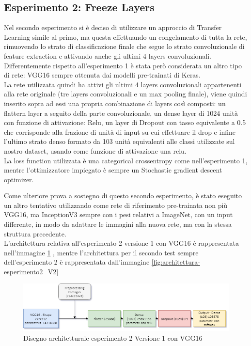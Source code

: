 \subsection{Esperimento 2: Freeze Layers}

Nel secondo esperimento si è deciso di utilizzare un approccio di Transfer Learning simile al primo, ma questa effettuando un congelamento di tutta la rete, rimuovendo lo strato di classificazione finale che segue lo strato convoluzionale di feature extraction e attivando anche gli ultimi 4 layers convoluzionali.
Differentemente rispetto all'esperimento 1 è stata però considerata un altro tipo di rete: VGG16 sempre ottenuta dai modelli pre-trainati di Keras. \\
La rete utilizzata quindi ha attivi gli ultimi 4 layers convoluzionali appartenenti alla rete originale (tre layers convoluzionali e un max pooling finale), viene quindi inserito sopra ad essi una propria combinazione di layers così composti: un flattern layer a seguito della parte convoluzionale, un dense layer di 1024 unità con funzione di attivazione: Relu, un layer di Dropout con tasso equivalente a 0.5 che corrisponde alla frazione di unità di input su cui effettuare il drop e infine l'ultimo strato denso formato da 103 unità equivalenti alle classi utilizzate sul nostro dataset, usando come funzione di attivazione una relu.\\
La loss function utilizzata è una categorical crossentropy come nell'esperimento 1, mentre l'ottimizzatore impiegato è sempre un Stochastic gradient descent optimizer. \bigskip

Come ulteriore prova a sostegno di questo secondo esperimento, è stato eseguito un altro tentativo utilizzando come rete di riferimento pre-trainata non più VGG16, ma InceptionV3 sempre con i pesi relativi a ImageNet, con un input differente, in modo da adattare le immagini alla nuova rete, ma con la stessa struttura precedente. \\
L'architettura relativa all'esperimento 2 versione 1 con VGG16 è rappresentata nell'immagine \ref{fig:architettura-esperimento2_V1} , mentre l'architettura per il secondo test sempre dell'esperimento 2 è rappresentata dall'immagine \ref{fig:architettura-esperimento2_V2}

\begin{figure}
    \centering
    \includegraphics[width=1\textwidth]{./resources/AdvanceMachineLearningSchema-Esperimento2_V1.png}
    \caption{Disegno architetturale esperimento 2 Versione 1 con VGG16} 
    \label{fig:architettura-esperimento2_V1}
\end{figure}

